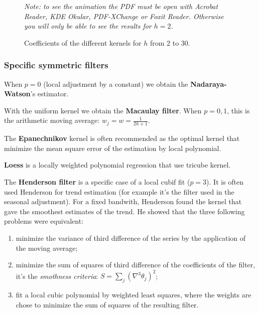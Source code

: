 \documentclass[
  12pt,
  ,
  a4paper]{article}
\providecommand{\tightlist}{%
  \setlength{\itemsep}{0pt}\setlength{\parskip}{0pt}}
\newcommand\1{\mathds{1}}
\begin{document}
\begin{figure}[!ht]
\caption{Coefficients of the different kernels for $h$ from 2 to 30.}\label{fig:kernels}\footnotesize
\emph{Note: to see the animation the PDF must be open with Acrobat Reader, KDE Okular, PDF-XChange or Foxit Reader. 
Otherwise you will only be able to see the results for $h=2$.}
\end{figure}

\hypertarget{sec:sympolyfilter}{%
\subsubsection{Specific symmetric filters}\label{sec:sympolyfilter}}

When \(p=0\) (local adjustment by a constant) we obtain the \textbf{Nadaraya-Watson}'s estimator.

With the uniform kernel we obtain the \textbf{Macaulay filter}. When \(p=0,1\), this is the arithmetic moving average: \(w_j=w=\frac{1}{2h+1}\).

The \textbf{Epanechnikov} kernel is often recommended as the optimal kernel that minimize the mean square error of the estimation by local polynomial.

\textbf{Loess} is a locally weighted polynomial regression that use tricube kernel.

The \textbf{Henderson filter} is a specific case of a local cubif fit (\(p=3\)).
It is often used Henderson for trend estimation (for example it's the filter used in the seasonal adjustment). For a fixed bandwith, Henderson found the kernel that gave the smoothest estimates of the trend.
He showed that the three following problems were equivalent:

\begin{enumerate}
\def\labelenumi{\arabic{enumi}.}
\tightlist
\item
  minimize the variance of third difference of the series by the application of the moving average;\\
\item
  minimize the sum of squares of third difference of the coefficients of the filter, it's the \emph{smothness criteria}: \(S=\sum_j(\nabla^{3}\theta_{j})^{2}\);\\
\item
  fit a local cubic polynomial by weighted least squares, where the weights are chose to minimize the sum of squares of the resulting filter.
\end{enumerate}
\end{document}
